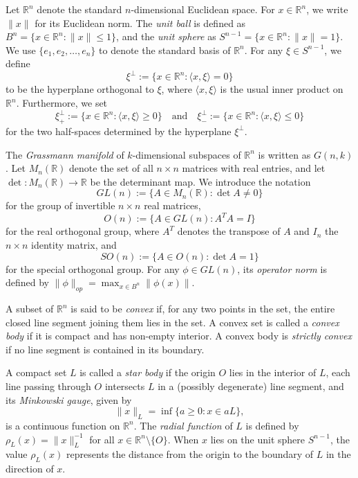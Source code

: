 \documentclass[amsfonts,reqno,11pt]{amsart}
\newcommand{\R}{\mathbb{R}}
\begin{document}
Let $\mathbb{R}^n$ denote the standard $n$-dimensional Euclidean space. For $x \in \mathbb{R}^n$, we write $\|x\|$ for its Euclidean norm. The {\it unit ball} is defined as $B^n = \{x \in \mathbb{R}^n : \|x\| \le 1\}$, and the {\it unit sphere} as $S^{n-1} = \{x \in \mathbb{R}^n : \|x\| = 1\}$. We use $\{e_1, e_2, \dots, e_n\}$ to denote the standard basis of $\mathbb{R}^n$. For any $\xi \in S^{n-1}$, we define
\[
\xi^\perp := \{x \in \mathbb{R}^n : \langle x, \xi \rangle = 0\}
\]
to be the hyperplane orthogonal to $\xi$, where $\langle x, \xi \rangle$ is the usual inner product on $\mathbb{R}^n$. Furthermore, we set
\[
\xi_+^\perp := \{x \in \mathbb{R}^n : \langle x, \xi \rangle \ge 0\}
\quad\text{and}\quad
\xi_-^\perp := \{x \in \mathbb{R}^n : \langle x, \xi \rangle \le 0\}
\]
for the two half-spaces determined by the hyperplane $\xi^\perp$.

The {\it Grassmann manifold} of $k$-dimensional subspaces of $\R^n$ is written as $G(n,k)$. Let $M_n(\mathbb{R})$ denote the set of all $n\times n$ matrices with real entries, and let $\det : M_n(\mathbb{R}) \to \mathbb{R}$ be the determinant map. We introduce the notation
\[
GL(n) := \{A \in M_n(\mathbb{R}) : \det A \neq 0\}
\]
for the group of invertible $n\times n$ real matrices,
\[
O(n) := \{A \in GL(n) : A^T A = I\}
\]
for the real orthogonal group, where $A^T$ denotes the transpose of $A$ and $I_n$ the $n\times n$ identity matrix, and
\[
SO(n) := \{A \in O(n) : \det A = 1\}
\]
for the special orthogonal group.
For any $\phi\in GL(n)$, its {\it operator norm} is defined by $\|\phi\|_{op}=\max_{x\in B^n}\|\phi(x)\|$.


A subset of $\mathbb{R}^n$ is said to be {\it convex} if, for any two points in the set, the entire closed line segment joining them lies in the set. A convex set is called a {\it convex body} if it is compact and has non-empty interior. A convex body is {\it strictly convex} if no line segment is contained in its boundary.


A compact set $L$ is called a {\it star body} if the origin $O$ lies in the interior of $L$, each line passing through $O$ intersects $L$ in a (possibly degenerate) line segment, and its {\it Minkowski gauge}, given by
$$\|x\|_L = \inf\{a\ge 0: x \in aL\},$$
is a continuous function on $\mathbb R^n$. The {\it radial function} of $L$ is defined by $\rho_L (x) = \|x\|_L^{-1}$ for all $x\in \mathbb{R}^n\setminus \{O\}$. When $x$ lies on the unit sphere $S^{n-1}$, the value $\rho_L(x)$ represents the distance from the origin to the boundary of $L$ in the direction of $x$.
\end{document}
